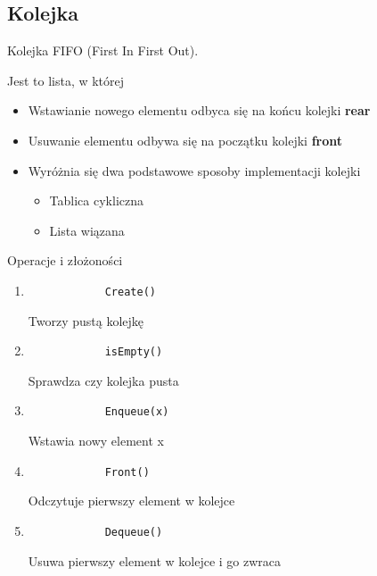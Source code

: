 \documentclass[main.tex]{subfiles}
\begin{document}
    \subsection{Kolejka}
    \begin{definition}
        Kolejka FIFO (First In First Out).

        Jest to lista, w której
        \begin{itemize}
            \item Wstawianie nowego elementu odbyca się na końcu kolejki \textbf{rear}
            \item Usuwanie elementu odbywa się na początku kolejki \textbf{front}\\
            \item Wyróżnia się dwa podstawowe sposoby implementacji kolejki
            \begin{itemize}
                \item Tablica cykliczna
                \item Lista wiązana
            \end{itemize}
        \end{itemize}
    \end{definition}

    Operacje i złożoności
    \begin{enumerate}
        \item
        \begin{verbatim}
            Create()
        \end{verbatim}
        Tworzy pustą kolejkę
        \item
        \begin{verbatim}
            isEmpty()
        \end{verbatim}
        Sprawdza czy kolejka pusta
        \item
        \begin{verbatim}
            Enqueue(x)
        \end{verbatim}
        Wstawia nowy element x
        \item
        \begin{verbatim}
            Front()
        \end{verbatim}
        Odczytuje pierwszy element w kolejce
        \item
        \begin{verbatim}
            Dequeue()
        \end{verbatim}
        Usuwa pierwszy element w kolejce i go zwraca
    \end{enumerate}
\end{document}
